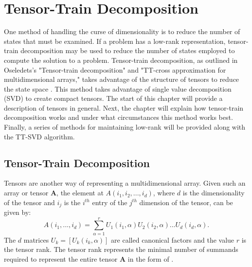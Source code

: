 \chapter{Tensor-Train Decomposition}\label{chp:TT}

One method of handling the curse of dimensionality is to reduce the number of states that must be examined. If a problem has a low-rank representation, tensor-train decomposition may be used to reduce the number of states employed to compute the solution to a problem. Tensor-train decomposition, as outlined in Oseledets's "Tensor-train decomposition" and "TT-cross approximation for multidimensional arrays," takes advantage of the structure of tensors to reduce the state space \cite{Osel1,Osel2}. This method takes advantage of single value decomposition (SVD) to create compact tensors. The start of this chapter will provide a description of tensors in general. Next, the chapter will explain how tensor-train decomposition works and under what circumstances this method works best. Finally, a series of methods for maintaining low-rank will be provided along with the TT-SVD algorithm.

\section{Tensor-Train Decomposition}
Tensors are another way of representing a multidimensional array. Given such an array or tensor \textbf{A}, the element at $A(i_1,i_2,...,i_d)$, where $d$ is the dimensionality of the tensor and $i_j$ is the $i^{th}$ entry of the $j^{th}$ dimension of the tensor, can be given by:
\begin{equation}\label{eqn4}
A(i_1,...,i_d) = \sum_{\alpha=1}^{r}U_1(i_1,\alpha)U_2(i_2,\alpha)...U_d(i_d,\alpha).
\end{equation}
The $d$ matrices $U_k = [U_k(i_k,\alpha)]$ are called canonical factors and the value $r$ is the tensor rank. The tensor rank represents the minimal number of summands required to represent the entire tensor \textbf{A} in the form of .

